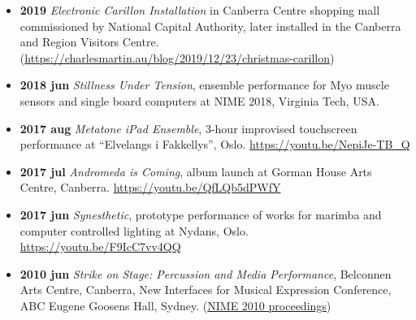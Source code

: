 \documentclass[11pt, a4paper, oneside]{article}
\begin{document}
\begin{itemize}
\item \textbf{2019} \emph{Electronic Carillon Installation} in Canberra Centre shopping mall commissioned by National Capital Authority, later installed in the Canberra and Region Visitors Centre. (\url{https://charlesmartin.au/blog/2019/12/23/christmas-carillon})

\item \textbf{2018 jun} \emph{Stillness Under Tension}, ensemble performance
  for Myo muscle sensors and single board computers at NIME 2018,
  Virginia Tech, USA.

\item \textbf{2017 aug} \emph{Metatone iPad Ensemble}, 3-hour
  improvised touchscreen performance at ``Elvelangs i Fakkellys'',
  Oslo. \url{https://youtu.be/NepiJe-TB_Q}

\item \textbf{2017 jul} \emph{Andromeda is Coming}, album launch at
  Gorman House Arts Centre, Canberra.
  \url{https://youtu.be/QfLQb5dPWfY}

\item \textbf{2017 jun} \emph{Synesthetic}, prototype performance of
  works for marimba and computer controlled lighting at Nydans, Oslo.
  \url{https://youtu.be/F9IcC7vv4QQ}

\item \textbf{2010 jun} \emph{Strike on Stage: Percussion and Media Performance}, Belconnen Arts Centre, Canberra, New Interfaces for Musical Expression Conference, ABC Eugene Goosens Hall, Sydney. (\href{https://nime.org/proc_music/nime2010_music_lai/index.html}{NIME 2010 proceedings})







\end{itemize}
\end{document}
